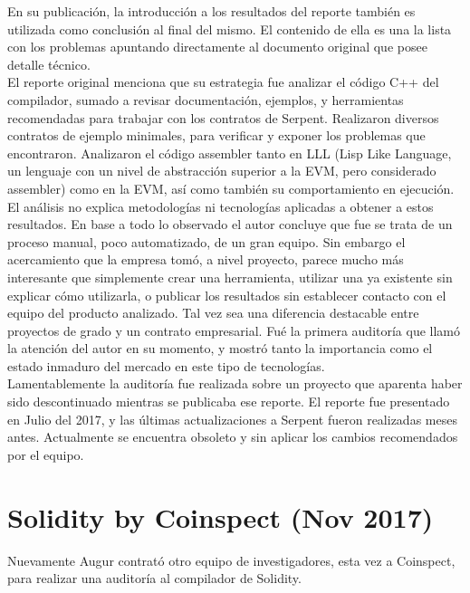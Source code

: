 En su publicación\cite{SerpentCompilerAuditZep}, la introducción a los resultados del reporte también es utilizada como conclusión al final del mismo. El contenido de ella es una la lista con los problemas apuntando directamente al documento original que posee detalle técnico.\\

El reporte original menciona que su estrategia fue analizar el código C++ del compilador, sumado a revisar documentación, ejemplos, y herramientas recomendadas para trabajar con los contratos de Serpent. Realizaron diversos contratos de ejemplo minimales, para verificar y exponer los problemas que encontraron. Analizaron el código assembler tanto en LLL (Lisp Like Language, un lenguaje con un nivel de abstracción superior a la EVM, pero considerado assembler) como en la EVM, así como también su comportamiento en ejecución.\\

El análisis no explica metodologías ni tecnologías aplicadas a obtener a estos resultados. En base a todo lo observado el autor concluye que fue se trata de un proceso manual, poco automatizado, de un gran equipo. Sin embargo el acercamiento que la empresa tomó, a nivel proyecto, parece mucho más interesante que simplemente crear una herramienta, utilizar una ya existente sin explicar cómo utilizarla, o publicar los resultados sin establecer contacto con el equipo del producto analizado. Tal vez sea una diferencia destacable entre proyectos de grado y un contrato empresarial.
Fué la primera auditoría que llamó la atención del autor en su momento, y mostró tanto la importancia como el estado inmaduro del mercado en este tipo de tecnologías.\\ 

Lamentablemente la auditoría fue realizada sobre un proyecto que aparenta haber sido descontinuado mientras se publicaba ese reporte. El reporte fue presentado en Julio del 2017, y las últimas actualizaciones a Serpent fueron realizadas meses antes. Actualmente se encuentra obsoleto y sin aplicar los cambios recomendados por el equipo.


\section{Solidity by Coinspect (Nov 2017)}
Nuevamente Augur contrató otro equipo de investigadores, esta vez a Coinspect, para realizar una auditoría al compilador de Solidity.\\

